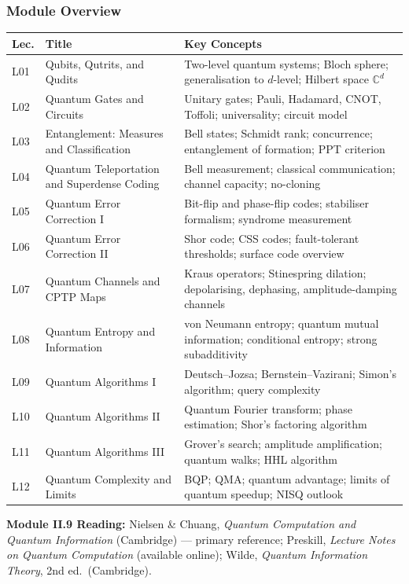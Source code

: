\documentclass[11pt,a4paper]{article}
\begin{document}
\subsubsection*{Module Overview}
{\footnotesize
\begin{center}
\begin{tabular}{@{}lp{4.2cm}p{6.8cm}@{}}
\toprule
\textbf{Lec.} & \textbf{Title} & \textbf{Key Concepts}\\
\midrule
L01 & Qubits, Qutrits, and Qudits & Two-level quantum systems; Bloch sphere; generalisation to $d$-level; Hilbert space $\mathbb{C}^d$\\
L02 & Quantum Gates and Circuits & Unitary gates; Pauli, Hadamard, CNOT, Toffoli; universality; circuit model\\
L03 & Entanglement: Measures and Classification & Bell states; Schmidt rank; concurrence; entanglement of formation; PPT criterion\\
L04 & Quantum Teleportation and Superdense Coding & Bell measurement; classical communication; channel capacity; no-cloning\\
\midrule
L05 & Quantum Error Correction I & Bit-flip and phase-flip codes; stabiliser formalism; syndrome measurement\\
L06 & Quantum Error Correction II & Shor code; CSS codes; fault-tolerant thresholds; surface code overview\\
L07 & Quantum Channels and CPTP Maps & Kraus operators; Stinespring dilation; depolarising, dephasing, amplitude-damping channels\\
L08 & Quantum Entropy and Information & von Neumann entropy; quantum mutual information; conditional entropy; strong subadditivity\\
\midrule
L09 & Quantum Algorithms I & Deutsch--Jozsa; Bernstein--Vazirani; Simon's algorithm; query complexity\\
L10 & Quantum Algorithms II & Quantum Fourier transform; phase estimation; Shor's factoring algorithm\\
L11 & Quantum Algorithms III & Grover's search; amplitude amplification; quantum walks; HHL algorithm\\
L12 & Quantum Complexity and Limits & BQP; QMA; quantum advantage; limits of quantum speedup; NISQ outlook\\
\bottomrule
\end{tabular}
\end{center}
}

\begin{tcolorbox}[highlightbox]
\textbf{Module II.9 Reading:} Nielsen \& Chuang, \textit{Quantum Computation and Quantum Information} (Cambridge) --- primary reference; Preskill, \textit{Lecture Notes on Quantum Computation} (available online); Wilde, \textit{Quantum Information Theory}, 2nd ed.\ (Cambridge).
\end{tcolorbox}
\end{document}
